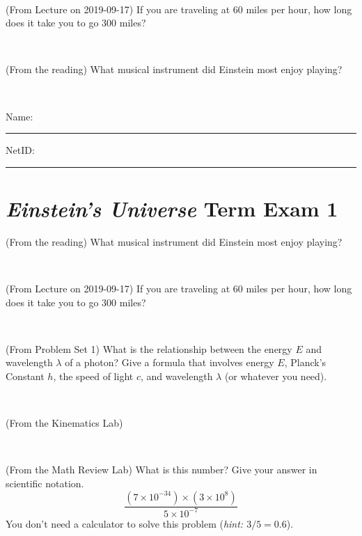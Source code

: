 \documentclass[12pt, letterpaper]{article}
\begin{document}
\vfill ~

\begin{problem} (From Lecture on 2019-09-17)
If you are traveling at 60 miles per hour, how long does
it take you to go 300 miles?
\end{problem}


\vfill ~

\begin{problem} (From the reading)
What musical instrument did Einstein most enjoy playing?
\end{problem}


\vfill ~


\cleardoublepage



\noindent
Name: \rule[-1ex]{0.60\textwidth}{0.1pt}
NetID: \rule[-1ex]{0.20\textwidth}{0.1pt}

\section*{\textsl{Einstein's Universe} Term Exam 1}
\setcounter{problem}{1}


\begin{problem} (From the reading)
What musical instrument did Einstein most enjoy playing?
\end{problem}


\vfill ~

\begin{problem} (From Lecture on 2019-09-17)
If you are traveling at 60 miles per hour, how long does
it take you to go 300 miles?
\end{problem}


\vfill ~

\begin{problem} (From Problem Set 1)
What is the relationship between the energy $E$ and wavelength
$\lambda$ of a photon? Give a formula that involves energy $E$,
Planck's Constant $h$, the speed of light $c$, and wavelength
$\lambda$ (or whatever you need).
\end{problem}

\vfill ~

\begin{problem} (From the Kinematics Lab)

\end{problem}


\vfill ~


\clearpage


\begin{problem} (From the Math Review Lab)
What is this number? Give your answer in scientific notation.
$$
\frac{(7\times10^{-34})\times(3\times10^8)}{5\times10^{-7}}
$$
You don't need a calculator to solve this problem (\textit{hint: $3/5=0.6$}).
\end{problem}
\end{document}
